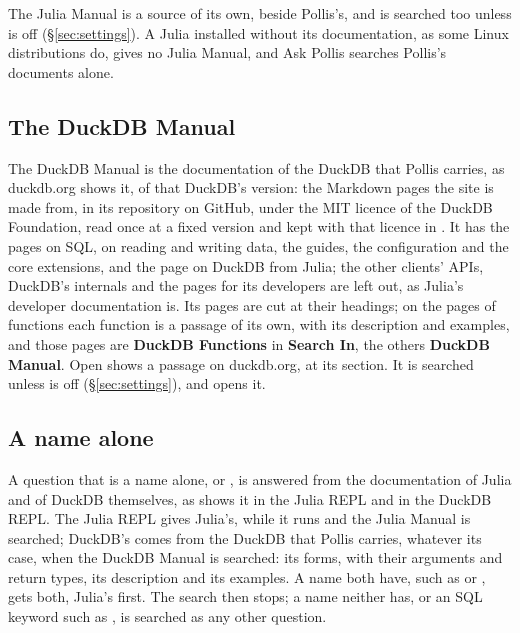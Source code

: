 The Julia Manual is a source of its own, beside Pollis's, and is searched too unless  is
off (\S\ref{sec:settings}). A Julia installed without its documentation, as some Linux distributions do, gives no
Julia Manual, and Ask Pollis searches Pollis's documents alone.

\subsection{The DuckDB Manual}\label{sec:duckdb}
The DuckDB Manual is the documentation of the DuckDB that Pollis carries, as duckdb.org shows it, of that DuckDB's
version: the Markdown pages the site is made from, in its repository on GitHub, under the MIT licence of the DuckDB
Foundation, read once at a fixed version and kept with that licence in . It has the
pages on SQL, on reading and writing data, the guides, the configuration and the core extensions, and the page on DuckDB
from Julia; the other clients' APIs, DuckDB's internals and the pages for its developers are left out, as Julia's
developer documentation is. Its pages are cut at their headings; on the pages of functions each function is a passage
of its own, with its description and examples, and those pages are \textbf{DuckDB Functions} in \textbf{Search In}, the others
\textbf{DuckDB Manual}. Open shows a passage on duckdb.org, at its section. It is searched unless
 is off (\S\ref{sec:settings}), and  opens it.

\subsection{A name alone}\label{sec:name}
A question that is a name alone,  or , is answered from the documentation of Julia and of
DuckDB themselves, as  shows it in the Julia REPL and in the DuckDB REPL. The Julia REPL gives Julia's,
while it runs and the Julia Manual is searched; DuckDB's comes from the DuckDB that Pollis carries, whatever its case,
when the DuckDB Manual is searched: its forms, with their arguments and return types, its description and its examples. A name
both have, such as  or , gets both, Julia's first. The search then stops; a name neither has, or
an SQL keyword such as , is searched as any other question.


